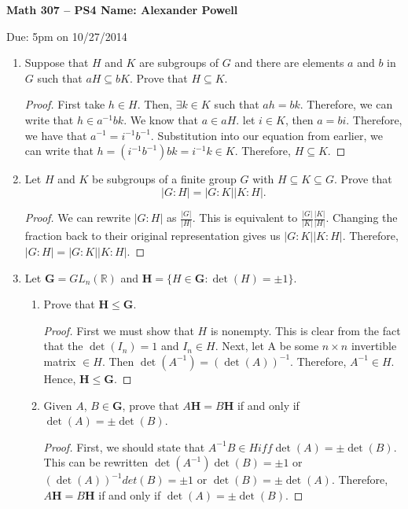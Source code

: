 \documentclass[a4paper]{article}
\newcommand{\bb}[1]{\mathbb{#1}}								%
\begin{document}
\textbf{Math 307 -- PS4 \hfill Name: Alexander Powell}

Due: 5pm on 10/27/2014

\begin{enumerate}[leftmargin=*, label=(\textbf{\arabic*})]
\item Suppose that $H$ and $K$ are subgroups of $G$ and there are elements $a$ and $b$ in $G$ such that $aH \subseteq bK$. Prove that $H \subseteq K$. 

\begin{proof}
First take $h \in H$.  Then, $\exists k \in K$ such that $ah=bk$.  Therefore, we can write that $h \in a^{-1} bk$.  We know that $a \in aH$.  let $i \in K$, then $a=bi$.  Therefore, we have that $a^{-1}=i^{-1}b^{-1}$.  Substitution into our equation from earlier, we can write that $h=(i^{-1}b^{-1})bk=i^{-1}k \in K$.  Therefore, $H \subseteq K$.  
\end{proof}

\item Let $H$ and $K$ be subgroups of a finite group $G$ with $H \subseteq K \subseteq  G$. Prove that 
\[|G:H| = |G:K||K:H|. \]

\begin{proof}
We can rewrite $|G:H|$ as $\frac{|G|}{|H|}$.  This is equivalent to $\frac{|G|}{|K|} \frac{|K|}{|H|}$.  Changing the fraction back to their original representation gives us $|G:K||K:H|$.  Therefore, $|G:H| = |G:K||K:H|$.  
\end{proof}

\item Let $\mathbf{G} = GL_n (\bb{R})$ and $\mathbf{H} = \{ H \in \mathbf{G}: \det(H) = \pm1 \}$.  

\begin{enumerate}[leftmargin=*, label=(\textbf{\alph*})]
\item Prove that $\mathbf{H} \leq \mathbf{G}$.


\begin{proof}
First we must show that $H$ is nonempty.  This is clear from the fact that the $\det(I_n) = 1$ and $I_n \in H$.  Next, let A be some $n \times n$ invertible matrix $\in H$.  Then $\det(A^{-1})=(\det(A))^{-1}$.  Therefore, $A^{-1} \in H$.  Hence, $\mathbf{H} \leq \mathbf{G}$.  
\end{proof}


\item Given $A$, $B \in \mathbf{G}$, prove that $A\mathbf{H}=B\mathbf{H}$ if and only if $\det(A) = \pm \det(B)$.

\begin{proof}
First, we should state that $A^{-1}B \in H iff \det(A)=\pm \det(B)$. This can be rewritten $\det(A^{-1})\det(B)=\pm 1$ or $(\det(A))^{-1}det(B)=\pm 1$ or $\det(B)=\pm \det(A)$.  Therefore, $A\mathbf{H}=B\mathbf{H}$ if and only if $\det(A) = \pm \det(B)$.  
\end{proof}


\end{enumerate}

%

\end{enumerate}
\end{document}
